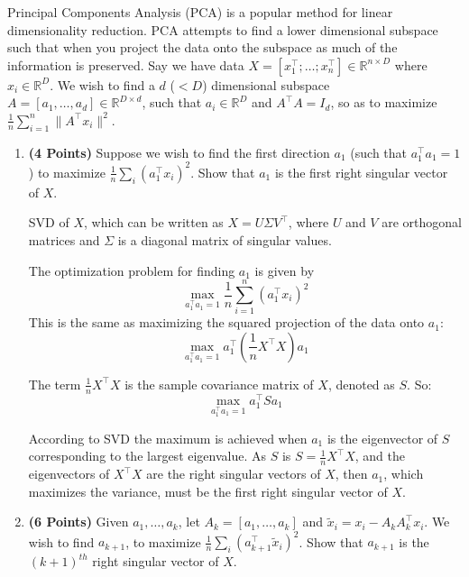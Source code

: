 \documentclass[a4paper]{article}
\theoremstyle{definition}
\newcommand{\RR}{\mathbb{R}}
\newenvironment{soln}{
    \leavevmode\color{blue}\ignorespaces
}{}
\begin{document}
Principal Components Analysis (PCA) is a popular method for linear dimensionality reduction. PCA attempts to find a lower dimensional subspace such that when you project the data onto the subspace as much of the information is preserved. Say we have data $X = [x_1^\top; \dots; x_n^\top] \in \RR^{n\times D}$ where  $x_i \in \RR^D$. We wish to find a $d$ ($ < D$) dimensional subspace $A = [a_1, \dots, a_d] \in \RR^{D\times d}$, such that $ a_i \in \RR^D$ and $A^\top A = I_d$, so as to maximize $\frac{1}{n} \sum_{i=1}^n \|A^\top x_i\|^2$.
\begin{enumerate}

\item  \textbf{(4 Points)}
    Suppose we wish to find the first direction $a_1$ (such that $a_1^\top a_1 = 1$) to maximize $\frac{1}{n} \sum_i (a_1^\top x_i)^2$.
    Show that $a_1$ is the first right singular vector of $X$.

    \begin{soln}
    SVD of \( X \), which can be written as \( X = U \Sigma V^{\top} \), where \( U \) and \( V \) are orthogonal matrices and \( \Sigma \) is a diagonal matrix of singular values.

    The optimization problem for finding \( a_1 \) is given by $$\max_{a_1^{\top} a_1 = 1} \frac{1}{n} \sum_{i=1}^{n} (a_1^{\top} x_i)^2$$
    This is the same as maximizing the squared projection of the data onto \( a_1 \):$$\max_{a_1^{\top} a_1 = 1} a_1^{\top} \left( \frac{1}{n} X^{\top}X \right) a_1$$

    The term \( \frac{1}{n} X^{\top}X \) is the sample covariance matrix of \( X \), denoted as \( S \). So:
    \[
    \max_{a_1^{\top} a_1 = 1} a_1^{\top} S a_1
    \]

    According to SVD the maximum is achieved when \( a_1 \) is the eigenvector of \( S \) corresponding to the largest eigenvalue. 
    As \( S \) is \( S = \frac{1}{n}X^{\top} X \), and the eigenvectors of \( X^{\top} X \) are the right singular vectors of \( X \), then \( a_1 \), which 
    maximizes the variance, must be the first right singular vector of \( X \).

\end{soln}

\item  \textbf{(6 Points)}
Given $a_1, \dots, a_k$, let $A_k = [a_1, \dots, a_k]$ and 
$\tilde{x}_i = x_i - A_kA_k^\top x_i$. We wish to find $a_{k+1}$, to maximize
$\frac{1}{n} \sum_i (a_{k+1}^\top \tilde{x}_i)^2$. Show that $a_{k+1}$ is the
$(k+1)^{th}$ right singular vector of $X$.


\end{enumerate}
\end{document}
